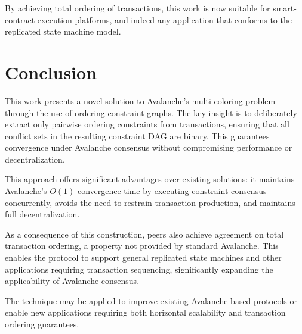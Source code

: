 \documentclass[12pt]{article}
\begin{document}
By achieving total ordering of transactions, this work is now suitable for
smart-contract execution platforms, and indeed any application that conforms
to the replicated state machine model.

\section{Conclusion}
This work presents a novel solution to Avalanche's multi-coloring problem
through the use of ordering constraint graphs. The key insight is to
deliberately extract only pairwise ordering constraints from transactions,
ensuring that all conflict sets in the resulting constraint DAG are binary.
This guarantees convergence under Avalanche consensus without compromising
performance or decentralization.

This approach offers significant advantages over existing solutions: it
maintains Avalanche's $O(1)$ convergence time by executing constraint consensus
concurrently, avoids the need to restrain transaction production, and maintains
full decentralization.

As a consequence of this construction, peers also achieve agreement on total
transaction ordering, a property not provided by standard Avalanche. This
enables the protocol to support general replicated state machines and other
applications requiring transaction sequencing, significantly expanding the
applicability of Avalanche consensus.

The technique may be applied to improve existing Avalanche-based protocols or
enable new applications requiring both horizontal scalability and transaction
ordering guarantees.



\end{document}
